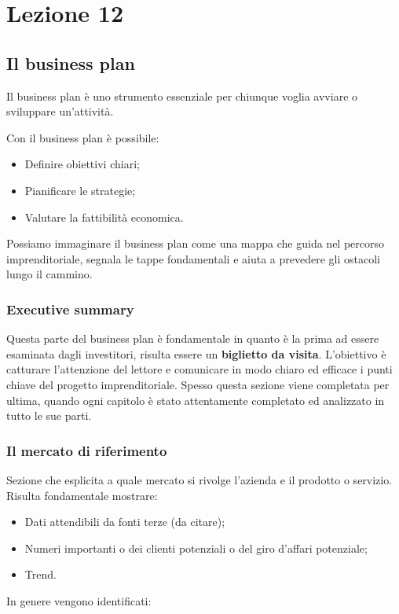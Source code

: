 \documentclass[14pt]{extarticle}
\begin{document}
\section{Lezione 12}

\subsection{Il business plan}

Il business plan è uno strumento essenziale per chiunque voglia avviare o
sviluppare un'attività.

Con il business plan è possibile: 

\begin{itemize}
    \item Definire obiettivi chiari;
    \item Pianificare le strategie;
    \item Valutare la fattibilità economica.
\end{itemize}
Possiamo immaginare il business plan come una mappa che guida nel percorso
imprenditoriale, segnala le tappe fondamentali e aiuta a prevedere gli ostacoli
lungo il cammino.

\subsubsection{Executive summary}

Questa parte del business plan è fondamentale in quanto è la prima ad essere
esaminata dagli investitori, risulta essere un \textbf{biglietto da visita}.
L'obiettivo è catturare l'attenzione del lettore e comunicare in modo chiaro ed
efficace i punti chiave del progetto imprenditoriale. Spesso questa sezione
viene completata per ultima, quando ogni capitolo è stato attentamente
completato ed analizzato in tutto le sue parti.

\subsubsection{Il mercato di riferimento}

Sezione che esplicita a quale mercato si rivolge l'azienda e il prodotto o
servizio. Risulta fondamentale mostrare:

\begin{itemize}
    \item Dati attendibili da fonti terze (da citare);
    \item Numeri importanti o dei clienti potenziali o del giro d'affari
    potenziale;
    \item Trend. 
\end{itemize}
In genere vengono identificati:
\end{document}

